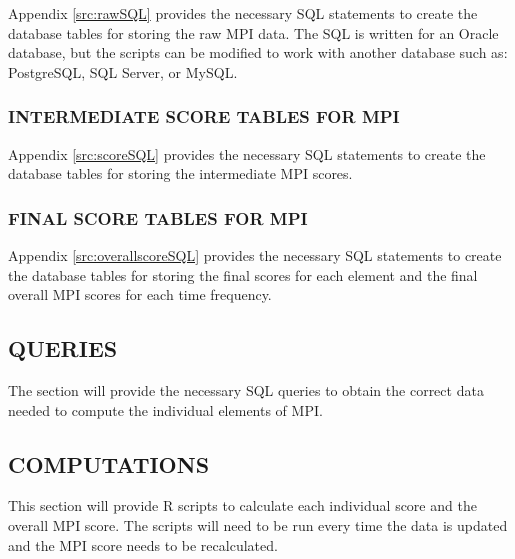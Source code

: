 \documentclass[SDSUThesis.tex]{subfiles}
\begin{document}
        Appendix \ref{src:rawSQL} provides the necessary SQL statements to create the 
        database tables for storing the raw MPI data.  The SQL is written for an Oracle
        database, but the scripts can be modified to work with another database
        such as: PostgreSQL, SQL Server, or MySQL.  
        
    \subsubsection{INTERMEDIATE SCORE TABLES FOR MPI}
    
        Appendix \ref{src:scoreSQL} provides the necessary SQL statements to create the 
        database tables for storing the intermediate MPI scores.
    
    \subsubsection{FINAL SCORE TABLES FOR MPI}
    
        Appendix \ref{src:overallscoreSQL} provides the necessary SQL statements to create the 
        database tables for storing the final scores for each element and the final 
        overall MPI scores for each time frequency.

\subsection{QUERIES}
    The section will provide the necessary SQL queries to obtain the correct data
    needed to compute the individual elements of MPI.
    
\subsection{COMPUTATIONS}
    This section will provide R scripts to calculate each individual score and the overall 
    MPI score. The scripts will need to be run every time the data is updated and the MPI
    score needs to be recalculated.
\end{document}
